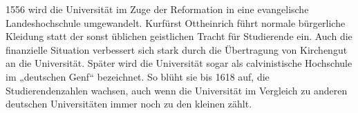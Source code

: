 1556 wird die Universität im Zuge der Reformation in eine evangelische 
Landeshochschule umgewandelt. Kurfürst Ottheinrich führt normale bürgerliche 
Kleidung statt der sonst üblichen geistlichen Tracht für Studierende ein. Auch die 
finanzielle Situation verbessert sich stark durch die Übertragung von Kirchengut an 
die Universität. Später wird die Universität sogar als calvinistische Hochschule im 
„deutschen Genf“ bezeichnet. So blüht sie bis 1618 auf, die Studierendenzahlen wachsen, 
auch wenn die Universität im Vergleich zu anderen deutschen Universitäten immer noch 
zu den kleinen zählt.
